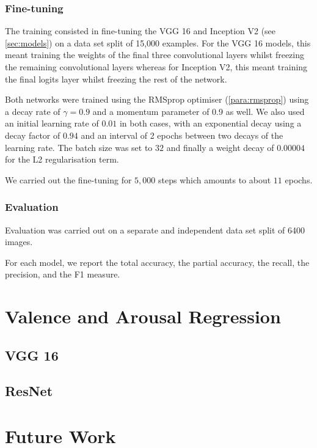\documentclass[12pt,twoside]{article}
\begin{document}
\subsubsection{Fine-tuning}

The training consisted in fine-tuning the VGG 16 and Inception V2 (see
\ref{sec:models}) on a data set split of 15,000 examples.
For the VGG 16 models, this meant training the weights of
the final three convolutional layers whilst freezing the remaining
convolutional layers whereas for Inception V2, this meant training the final
logits layer whilst freezing the rest of the network. 

Both networks were trained using the RMSprop optimiser (\ref{para:rmsprop})
using a decay rate of $\gamma = 0.9$ and a momentum parameter of 0.9 as well.
We also used an initial learning rate of $0.01$ in both cases, with an
exponential decay using a decay factor of $0.94$ and an interval of 2 epochs
between two decays of the learning rate. The batch size was set to $32$ and
finally a weight decay of $0.00004$ for the L2 regularisation term. 

We carried out the fine-tuning for $5,000$ steps which amounts to about
$11$ epochs.

\subsubsection{Evaluation}

Evaluation was carried out on a separate and independent data set split of 6400
images.

For each model, we report the total accuracy, the partial accuracy, the recall,
the precision, and the F1 measure.


\section{Valence and Arousal Regression}

\subsection{VGG 16}

\subsection{ResNet}

\section{Future Work}








\clearpage



\appendix
\end{document}
